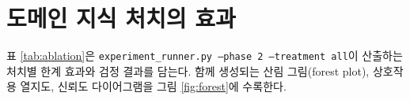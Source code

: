 
\section{도메인 지식 처치의 효과}
\label{sec:results-ablation}



표 \ref{tab:ablation}은 \texttt{experiment\_runner.py --phase 2 --treatment all}이 산출하는 처치별 한계 효과와 검정 결과를 담는다. 함께 생성되는 산림 그림(forest plot), 상호작용 열지도, 신뢰도 다이어그램을 그림 \ref{fig:forest}에 수록한다. 


